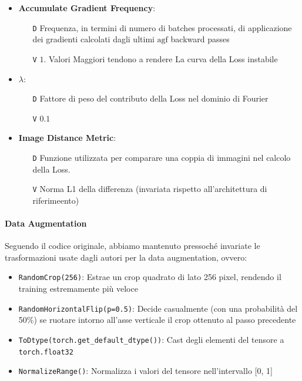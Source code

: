 \documentclass[a4paper,10pt,twocolumn]{article}
\begin{document}
\begin{itemize}[topsep=0pt, noitemsep]
  \item
    \textbf{Accumulate Gradient Frequency}:
    \begin{itemize}[topsep=0pt, noitemsep]
      \item[\texttt{D}] Frequenza, in termini di numero di batches processati, di applicazione dei gradienti calcolati dagli ultimi
        $\mathrm{agf}$ backward passes
      \item[\texttt{V}] $1$. Valori Maggiori tendono a rendere La curva della Loss instabile
    \end{itemize}

  \item
    \textbf{$\lambda$}:
    \begin{itemize}[topsep=0pt, noitemsep]
      \item[\texttt{D}] Fattore di peso del contributo della Loss nel dominio di Fourier
      \item[\texttt{V}] $0.1$
    \end{itemize}

  \item
    \textbf{Image Distance Metric}:
    \begin{itemize}[topsep=0pt, noitemsep]
      \item[\texttt{D}] Funzione utilizzata per comparare una coppia di immagini nel calcolo della Loss.
      \item[\texttt{V}] Norma L1 della differenza (invariata rispetto all'architettura di riferimeento)
    \end{itemize}
\end{itemize}

\paragraph{Data Augmentation}

Seguendo il codice originale, abbiamo mantenuto pressoché invariate le trasformazioni usate dagli autori per la data augmentation, ovvero:
\begin{itemize}
  \item \texttt{RandomCrop(256)}: Estrae un crop quadrato di lato 256 pixel, rendendo il training estremamente più veloce
  \item \texttt{RandomHorizontalFlip(p=0.5)}: Decide casualmente (con una probabilità del 50\%) se ruotare intorno all'asse verticale il crop ottenuto al passo precedente
  \item \texttt{ToDtype(torch.get\_default\_dtype())}: Cast degli elementi del tensore a \texttt{torch.float32}
  \item \texttt{NormalizeRange()}: Normalizza i valori del tensore nell'intervallo [0, 1]
\end{itemize}
\end{document}
